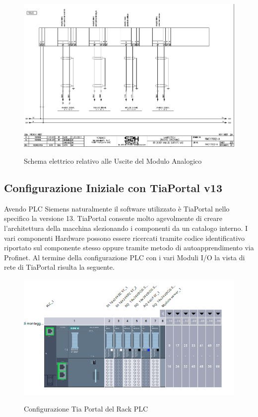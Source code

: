\documentclass[12pt, a4paper, oneside]{book}
\begin{document}
\begin{figure}[H]
	\centering
	\includegraphics[width=12cm]{Immagini/SCELE3}
	\label{scele3}
	\caption{Schema elettrico relativo alle Uscite del Modulo Analogico }
\end{figure}

\subsection{Configurazione Iniziale con TiaPortal v13}
	Avendo PLC Siemens naturalmente il software utilizzato è TiaPortal nello specifico la versione 13.
	TiaPortal consente molto agevolmente di creare l'architettura della macchina slezionando i componenti da un catalogo interno. I vari componenti Hardware possono essere ricercati tramite codice identificativo riportato sul componente stesso oppure tramite metodo di autoapprendimento via Profinet. Al termine della configurazione PLC con i vari Moduli I/O la vista di rete di TiaPortal risulta la seguente.
	
	\begin{figure}[H]
		\centering
		\includegraphics[width=12cm]{Immagini/TIA0}
		\label{tia0}
		\caption{Configurazione Tia Portal del Rack PLC}
	\end{figure}
\end{document}
